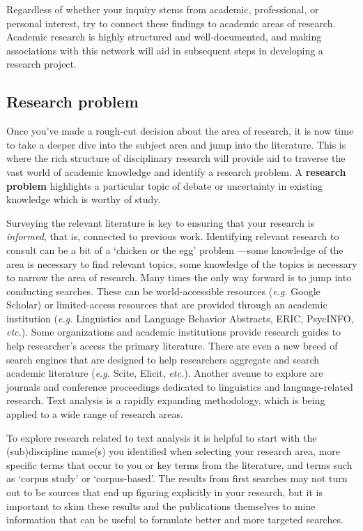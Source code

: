 \documentclass[
  letterpaper,
  krantz1]{latex/krantz-mod}
\theoremstyle{definition}
\theoremstyle{definition}
\theoremstyle{remark}
\begin{document}
Regardless of whether your inquiry stems from academic, professional, or
personal interest, try to connect these findings to academic areas of
research. Academic research is highly structured and well-documented,
and making associations with this network will aid in subsequent steps
in developing a research project.

\subsection{Research problem}\label{sec-research-problem}

Once you've made a rough-cut decision about the area of research, it is
now time to take a deeper dive into the subject area and jump into the
literature. This is where the rich structure of disciplinary research
will provide aid to traverse the vast world of academic knowledge and
identify a research problem. A \textbf{research
problem} highlights a particular topic of debate
or uncertainty in existing knowledge which is worthy of study.

Surveying the relevant literature is key to ensuring that your research
is \emph{informed}, that is, connected to previous work. Identifying
relevant research to consult can be a bit of a `chicken or the egg'
problem ---some knowledge of the area is necessary to find relevant
topics, some knowledge of the topics is necessary to narrow the area of
research. Many times the only way forward is to jump into conducting
searches. These can be world-accessible resources (\emph{e.g.} Google
Scholar) or limited-access resources that are provided through an
academic institution (\emph{e.g.} Linguistics and Language Behavior
Abstracts, ERIC, PsycINFO, \emph{etc.}). Some organizations and academic
institutions provide research guides to help researcher's access the
primary literature. There are even a new breed of search engines that
are designed to help researchers aggregate and search academic
literature (\emph{e.g.} Scite, Elicit, \emph{etc.}). Another avenue to
explore are journals and conference proceedings dedicated to linguistics
and language-related research. Text analysis is a rapidly expanding
methodology, which is being applied to a wide range of research areas.

To explore research related to text analysis it is helpful to start with
the (sub)discipline name(s) you identified when selecting your research
area, more specific terms that occur to you or key terms from the
literature, and terms such as `corpus study' or `corpus-based'. The
results from first searches may not turn out to be sources that end up
figuring explicitly in your research, but it is important to skim these
results and the publications themselves to mine information that can be
useful to formulate better and more targeted searches.
\end{document}
